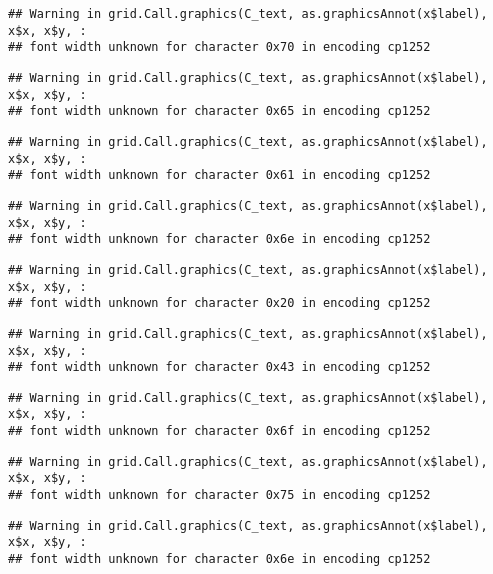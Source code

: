 \documentclass[
]{article}
\begin{document}
\begin{verbatim}
## Warning in grid.Call.graphics(C_text, as.graphicsAnnot(x$label), x$x, x$y, :
## font width unknown for character 0x70 in encoding cp1252
\end{verbatim}

\begin{verbatim}
## Warning in grid.Call.graphics(C_text, as.graphicsAnnot(x$label), x$x, x$y, :
## font width unknown for character 0x65 in encoding cp1252
\end{verbatim}

\begin{verbatim}
## Warning in grid.Call.graphics(C_text, as.graphicsAnnot(x$label), x$x, x$y, :
## font width unknown for character 0x61 in encoding cp1252
\end{verbatim}

\begin{verbatim}
## Warning in grid.Call.graphics(C_text, as.graphicsAnnot(x$label), x$x, x$y, :
## font width unknown for character 0x6e in encoding cp1252
\end{verbatim}

\begin{verbatim}
## Warning in grid.Call.graphics(C_text, as.graphicsAnnot(x$label), x$x, x$y, :
## font width unknown for character 0x20 in encoding cp1252
\end{verbatim}

\begin{verbatim}
## Warning in grid.Call.graphics(C_text, as.graphicsAnnot(x$label), x$x, x$y, :
## font width unknown for character 0x43 in encoding cp1252
\end{verbatim}

\begin{verbatim}
## Warning in grid.Call.graphics(C_text, as.graphicsAnnot(x$label), x$x, x$y, :
## font width unknown for character 0x6f in encoding cp1252
\end{verbatim}

\begin{verbatim}
## Warning in grid.Call.graphics(C_text, as.graphicsAnnot(x$label), x$x, x$y, :
## font width unknown for character 0x75 in encoding cp1252
\end{verbatim}

\begin{verbatim}
## Warning in grid.Call.graphics(C_text, as.graphicsAnnot(x$label), x$x, x$y, :
## font width unknown for character 0x6e in encoding cp1252
\end{verbatim}
\end{document}
